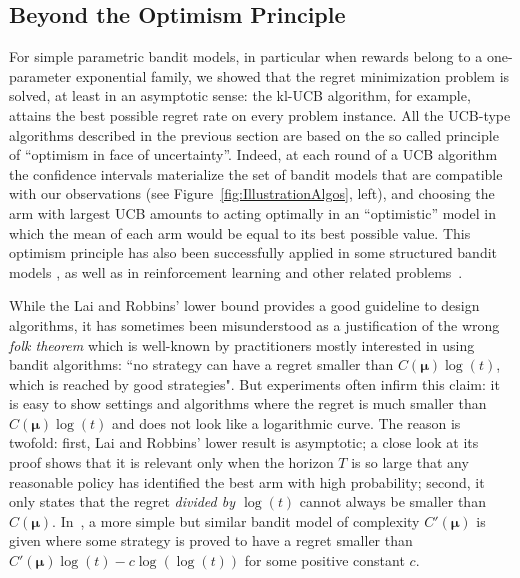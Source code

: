 \documentclass[proc]{edpsmath}
\begin{document}
	\subsection{Beyond the Optimism Principle}
	
	For simple parametric bandit models, in particular when rewards belong to a one-parameter exponential family, we showed that the regret minimization problem is solved, at least in an asymptotic sense: the kl-UCB algorithm, for example, attains the best possible regret rate on every problem instance. All the UCB-type algorithms described in the previous section are based on the so called principle of ``optimism in face of uncertainty''. Indeed, at each round of a UCB algorithm the confidence intervals materialize the set of bandit models that are compatible with our observations (see Figure~\ref{fig:IllustrationAlgos}, left), and choosing the arm with largest UCB amounts to acting optimally in an ``optimistic'' model in which the mean of each arm would be equal to its best possible value. This optimism principle has also been successfully applied in some structured bandit models \cite{YadLinear11}, as well as in reinforcement learning \cite{Auer:UCRL10} and other related problems~\cite{BG13}. 
	
	While the Lai and Robbins' lower bound provides a good guideline to design algorithms, it has sometimes been misunderstood as a justification of the wrong \emph{folk theorem} which is well-known by practitioners mostly interested in using bandit algorithms: ``no strategy can have a regret smaller than $C({\bm \mu})\log(t)$, which is reached by good strategies".
	But experiments often infirm this claim: it is easy to show settings and algorithms where the regret is much smaller than $C({\bm \mu})\log(t)$ and does not look like a logarithmic curve. The reason is twofold: first, Lai and Robbins' lower result is asymptotic; a close look at its proof shows that it is relevant only when the horizon $T$ is so large that any reasonable policy has identified the best arm with high probability; second, it only states that the regret \emph{divided by $\log(t)$} cannot always be smaller than $C({\bm \mu})$. In~\cite{GKL16}, a more simple but similar bandit model of complexity $C'({\bm \mu})$ is given where some strategy is proved to have a regret smaller than $C'({\bm \mu})\log(t)-c\log(\log(t))$ for some positive constant $c$.  
	
\end{document}
